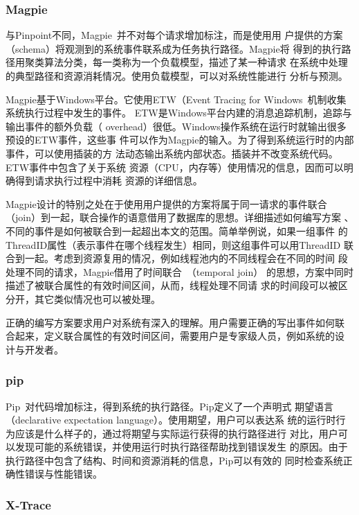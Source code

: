 \subsubsection*{Magpie}

与Pinpoint不同，Magpie~\cite{magpie}并不对每个请求增加标注，而是使用用
户提供的方案（schema）将观测到的系统事件联系成为任务执行路径。Magpie将
得到的执行路径用聚类算法分类，每一类称为一个负载模型，描述了某一种请求
在系统中处理的典型路径和资源消耗情况。使用负载模型，可以对系统性能进行
分析与预测。

Magpie基于Windows平台。它使用ETW（Event Tracing for
Windows~\cite{magpieref17, ref18}机制收集系统执行过程中发生的事件。
ETW是Windows平台内建的消息追踪机制，追踪与输出事件的额外负载（
overhead）很低。Windows操作系统在运行时就输出很多预设的ETW事件，这些事
件可以作为Magpie的输入。为了得到系统运行时的内部事件，可以使用插装的方
法动态输出系统内部状态。插装并不改变系统代码。ETW事件中包含了关于系统
资源（CPU，内存等）使用情况的信息，因而可以明确得到请求执行过程中消耗
资源的详细信息。

Magpie设计的特别之处在于使用用户提供的方案将属于同一请求的事件联合
（join）到一起，联合操作的语意借用了数据库的思想。详细描述如何编写方案
、不同的事件是如何被联合到一起超出本文的范围。简单举例说，如果一组事件
的ThreadID属性（表示事件在哪个线程发生）相同，则这组事件可以用ThreadID
联合到一起。考虑到资源复用的情况，例如线程池内的不同线程会在不同的时间
段处理不同的请求，Magpie借用了时间联合~\cite{magpie10}（temporal join）
的思想，方案中同时描述了被联合属性的有效时间区间，从而，线程处理不同请
求的时间段可以被区分开，其它类似情况也可以被处理。

正确的编写方案要求用户对系统有深入的理解。用户需要正确的写出事件如何联
合起来，定义联合属性的有效时间区间，需要用户是专家级人员，例如系统的设
计与开发者。

\subsubsection*{pip}

Pip~\cite{pip}对代码增加标注，得到系统的执行路径。Pip定义了一个声明式
期望语言（declarative expectation language）。使用期望，用户可以表达系
统的运行时行为应该是什么样子的，通过将期望与实际运行获得的执行路径进行
对比，用户可以发现可能的系统错误，并使用运行时执行路径帮助找到错误发生
的原因。由于执行路径中包含了结构、时间和资源消耗的信息，Pip可以有效的
同时检查系统正确性错误与性能错误。

\subsubsection*{X-Trace}

